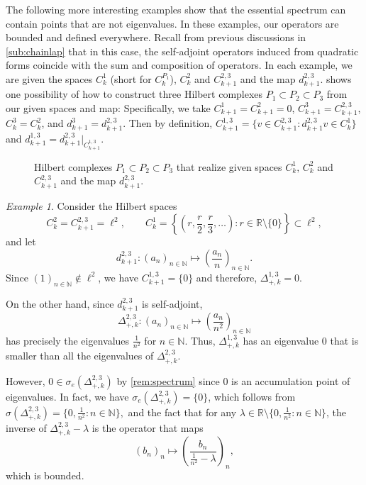 \documentclass[11pt]{article}
\theoremstyle{definition}
\theoremstyle{remark}
\newtheorem{example}[theorem]{Example}
\newcommand{\R}{\mathbb{R}}
\newcommand{\N}{\mathbb{N}}
\begin{document}
The following more interesting examples show that the essential spectrum can contain points that are not eigenvalues. In these examples, our operators are bounded and defined everywhere. Recall from previous discussions in \cref{sub:chainlap} that in this case, the self-adjoint operators induced from quadratic forms coincide with the sum and composition of operators. In each example, we are given the spaces $C_k^1$ (short for $C_k^{P_1}$), $C_k^2$ and $C_{k+1}^{2,3}$ and the map $d_{k+1}^{2,3}$.  shows one possibility of how to construct three Hilbert complexes $P_1 \subset P_2 \subset P_3$ from our given spaces and map: Specifically, we take $C_{k+1}^1=C_{k+1}^2=0$, $C_{k+1}^3=C_{k+1}^{2,3}$, $C_k^3=C_k^2$, and $d_{k+1}^3=d_{k+1}^{2,3}$. Then by definition, $C_{k+1}^{1,3}=\{v \in C_{k+1}^{2,3}: d_{k+1}^{2,3} v \in C_k^1 \}$ and $d_{k+1}^{1,3}=d_{k+1}^{2,3}|_{C_{k+1}^{1,3}}$. 
\begin{figure}[H]
    \centering
    \caption{Hilbert complexes $P_1\subset P_2 \subset P_3$ that realize given spaces $C_k^1,\, C_k^2$ and $C_{k+1}^{2,3}$ and the map $d_{k+1}^{2,3}$.}
    \label{fig:exspectra}
\end{figure}

\begin{example}\label{ex:espec}
    Consider the Hilbert spaces 
    $$
    C_k^2=C_{k+1}^{2,3}=\ell^2, \qquad C_k^1=\left\{\left(r,\frac r 2,\frac r 3,\dots \right): r \in \R \setminus \{0\}\right\} \subset \ell^2,
    $$
    and let 
    $$
    d_{k+1}^{2,3}: (a_n)_{n \in \N} \mapsto \left(\frac {a_n} n \right)_{n \in \N}.
    $$
    Since $(1)_{n \in \N} \not \in \ell^2$, we have $C_{k+1}^{1,3}=\{0\}$ and therefore, $\Delta_{+,k}^{1,3}=0$.
    
    On the other hand, since $d_{k+1}^{2,3}$ is self-adjoint,
    $$
        \Delta_{+,k}^{2,3}: (a_n)_{n \in \N} \mapsto \left(\frac {a_n} {n^2} \right)_{n \in \N}
    $$
    has precisely the eigenvalues $\frac{1}{n^2}$ for $n\in \N$. Thus, $\Delta_{+,k}^{1,3}$ has an eigenvalue 0 that is smaller than all the eigenvalues of $\Delta_{+,k}^{2,3}$.
    
    However,
    $0 \in \sigma_e(\Delta_{+,k}^{2,3})$ by \cref{rem:spectrum} since 0 is an accumulation point of eigenvalues. In fact, we have $\sigma_e(\Delta_{+,k}^{2,3})=\{0\}$, which follows from $\sigma(\Delta_{+,k}^{2,3})=\{0,\frac 1 {n^2}: n \in \N\},
    $
    and the fact that for any $\lambda \in \R \setminus \{0,\frac 1 {n^2}: n \in \N\}$, the inverse of $\Delta_{+,k}^{2,3}-\lambda $ is the operator that maps
    $$
        (b_n)_n \mapsto \left(\frac{b_n}{\frac{1}{n^2}-\lambda}\right)_n,
    $$
    which is bounded.
\end{example}
\end{document}
